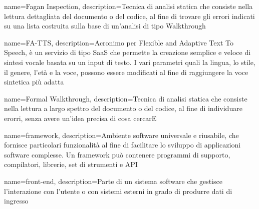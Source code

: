 {
	name=Fagan Inspection,
	description={Tecnica di analisi statica che consiste nella lettura dettagliata del documento o del codice, al fine di trovare gli errori indicati su una lista costruita sulla base di un'analisi di tipo Walkthrough}
}

{
	name=FA-TTS,
	description={Acronimo per Flexible and Adaptive Text To Speech, è un servizio di tipo SaaS che permette la creazione semplice e veloce di sintesi vocale basata su un input di testo. I vari parametri quali la lingua, lo stile, il genere, l'età e la voce, possono essere modificati al fine di raggiungere la voce sintetica più adatta}
}

{
	name=Formal Walkthrough,
	description={Tecnica di analisi statica che consiste nella lettura a largo spettro del documento o del codice, al fine di individuare erorri, senza avere un'idea precisa di cosa cercarE}
}

{
	name=framework,
	description={Ambiente software universale e riusabile, che fornisce particolari funzionalità al fine di facilitare lo sviluppo di applicazioni software complesse. Un framework può contenere programmi di supporto, compilatori, librerie, set di strumenti e API}
}

{
	name=front-end,
	description={Parte di un sistema software che gestisce l'interazione con l'utente o con sistemi esterni in grado di produrre dati di ingresso}
}